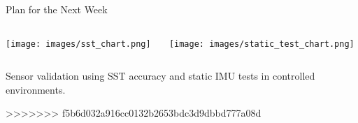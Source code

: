 \begin{frame}{Plan for the Next Week}
    \begin{columns}[T]
        \begin{column}{0.5\textwidth}
            \centering
            \texttt{[image: images/sst\_chart.png]}
        \end{column}
        \begin{column}{0.5\textwidth}
            \centering
            \texttt{[image: images/static\_test\_chart.png]}
        \end{column}
    \end{columns}
    \vspace{1em}
    \begin{center}
        \small Sensor validation using SST accuracy and static IMU tests in controlled environments.
    \end{center}
\end{frame}
>>>>>>> f5b6d032a916cc0132b2653bdc3d9dbbd777a08d